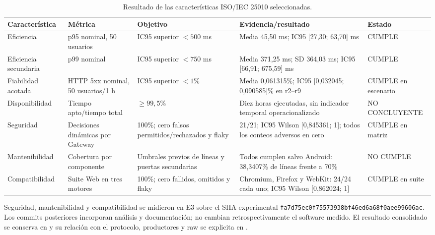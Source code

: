 \begin{table}[ht]
  \centering
  \small
  \caption{Resultado de las características ISO/IEC 25010 seleccionadas.}
  \label{tab:resultado-iso25010}
  \begin{tabular}{|p{2.3cm}|p{2.5cm}|p{2.2cm}|p{4.0cm}|p{1.8cm}|}
    \hline
    \textbf{Característica} & \textbf{Métrica} & \textbf{Objetivo} & \textbf{Evidencia/resultado} & \textbf{Estado} \\
    \hline
    Eficiencia & p95 nominal, 50 usuarios & IC95 superior $<500$ ms & Media 45,50 ms; IC95 [27,30; 63,70] ms & CUMPLE \\
    \hline
    Eficiencia secundaria & p99 nominal & IC95 superior $<750$ ms & Media 371,25 ms; SD 364,03 ms; IC95 [66,91; 675,59] ms & CUMPLE \\
    \hline
    Fiabilidad acotada & HTTP 5xx nominal, 50 usuarios/1 h & IC95 superior $<1\%$ & Media 0,061315\%; IC95 [0,032045; 0,090585]\% en r2--r9 & CUMPLE en escenario \\
    \hline
    Disponibilidad & Tiempo apto/tiempo total & $\geq99,5\%$ & Diez horas ejecutadas, sin indicador temporal operacionalizado & NO CONCLUYENTE \\
    \hline
    Seguridad & Decisiones dinámicas por Gateway & 100\%; cero falsos permitidos/rechazados y flaky & 21/21; IC95 Wilson [0,845361; 1]; todos los conteos adversos en cero & CUMPLE en matriz \\
    \hline
    Mantenibilidad & Cobertura por componente & Umbrales previos de líneas y puertas secundarias & Todos cumplen salvo Android: 38,3407\% de líneas frente a 70\% & NO CUMPLE \\
    \hline
    Compatibilidad & Suite Web en tres motores & 100\%; cero fallidos, omitidos y flaky & Chromium, Firefox y WebKit: 24/24 cada uno; IC95 Wilson [0,862024; 1] & CUMPLE en suite \\
    \hline
  \end{tabular}
\end{table}

Seguridad, mantenibilidad y compatibilidad se midieron en E3 sobre el SHA
experimental
\texttt{fa7d75ec0f75573938bf46ed6a68f0aee99606ac}. Los commits posteriores
incorporan análisis y documentación; no cambian retrospectivamente el software
medido. El resultado consolidado se conserva en
 y su relación con el
protocolo, productores y raw se explicita en
.

